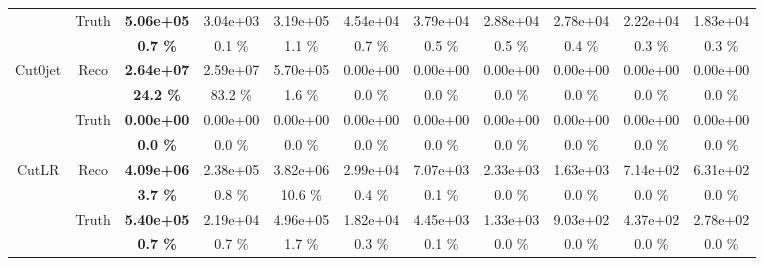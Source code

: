 \begin{appendices}
\begin{landscape}
\begin{table}
\begin{tabular}{|c|c|>{\bfseries}c|c|c|c|c|c|c|c|c|}
    \cline{2-11}                                                                                    
                                    & \multirow{2}{*}{Truth}    & 5.06e+05 & 3.04e+03 & 3.19e+05 & 4.54e+04 & 3.79e+04 & 2.88e+04 & 2.78e+04 & 2.22e+04 & 1.83e+04 \\
                                    &                           & 0.7 \%   & 0.1 \%   & 1.1 \%   & 0.7 \%   & 0.5 \%   & 0.5 \%   & 0.4 \%   & 0.3 \%   & 0.3 \%   \\
    \hline                                                                                      
    \hline                                                                                      
    \multirow{4}{*}{Cut0jet}        & \multirow{2}{*}{Reco}   & 2.64e+07 & 2.59e+07 & 5.70e+05 & 0.00e+00 & 0.00e+00 & 0.00e+00 & 0.00e+00 & 0.00e+00 & 0.00e+00 \\
                                    &                           & 24.2 \%  & 83.2 \%  & 1.6 \%   & 0.0 \%   & 0.0 \%   & 0.0 \%   & 0.0 \%   & 0.0 \%   & 0.0 \%   \\
    \cline{2-11}                                                                                    
                                    & \multirow{2}{*}{Truth}    & 0.00e+00 & 0.00e+00 & 0.00e+00 & 0.00e+00 & 0.00e+00 & 0.00e+00 & 0.00e+00 & 0.00e+00 & 0.00e+00 \\
                                    &                           & 0.0 \%   & 0.0 \%   & 0.0 \%   & 0.0 \%   & 0.0 \%   & 0.0 \%   & 0.0 \%   & 0.0 \%   & 0.0 \%   \\
    \hline                                                                                      
    \hline                                                                                      
    \multirow{4}{*}{CutLR}          & \multirow{2}{*}{Reco}   & 4.09e+06 & 2.38e+05 & 3.82e+06 & 2.99e+04 & 7.07e+03 & 2.33e+03 & 1.63e+03 & 7.14e+02 & 6.31e+02 \\
                                    &                           & 3.7 \%   & 0.8 \%   & 10.6 \%  & 0.4 \%   & 0.1 \%   & 0.0 \%   & 0.0 \%   & 0.0 \%   & 0.0 \%   \\
    \cline{2-11}                                                                                    
                                    & \multirow{2}{*}{Truth}    & 5.40e+05 & 2.19e+04 & 4.96e+05 & 1.82e+04 & 4.45e+03 & 1.33e+03 & 9.03e+02 & 4.37e+02 & 2.78e+02 \\
                                    &                           & 0.7 \%   & 0.7 \%   & 1.7 \%   & 0.3 \%   & 0.1 \%   & 0.0 \%   & 0.0 \%   & 0.0 \%   & 0.0 \%   \\

\end{tabular}
\end{table}
\end{landscape}
\end{appendices}
